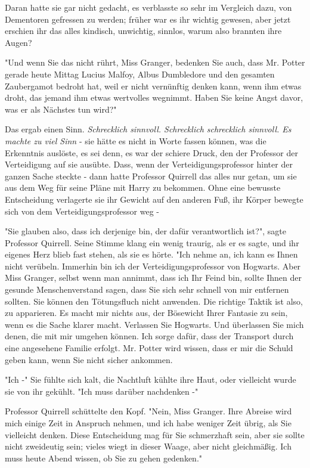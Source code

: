 {Daran hatte sie gar nicht gedacht, es verblasste so sehr im Vergleich dazu, von Dementoren gefressen zu werden; früher war es ihr wichtig gewesen, aber jetzt erschien ihr das alles kindisch, unwichtig, sinnlos, warum also brannten ihre Augen?

"Und wenn Sie das nicht rührt, Miss Granger, bedenken Sie auch, dass Mr. Potter gerade heute Mittag Lucius Malfoy, Albus Dumbledore und den gesamten Zaubergamot bedroht hat, weil er nicht vernünftig denken kann, wenn ihm etwas droht, das jemand ihm etwas wertvolles wegnimmt. Haben Sie keine Angst davor, was er als Nächstes tun wird?"

Das ergab einen Sinn. \emph{Schrecklich sinnvoll. Schrecklich schrecklich sinnvoll. Es machte zu viel Sinn} - sie hätte es nicht in Worte fassen können, was die Erkenntnis auslöste, es sei denn, es war der schiere Druck, den der Professor der Verteidigung auf sie ausübte. Dass, wenn der Verteidigungsprofessor hinter der ganzen Sache steckte - dann hatte Professor Quirrell das alles nur getan, um sie aus dem Weg für seine Pläne mit Harry zu bekommen. Ohne eine bewusste Entscheidung verlagerte sie ihr Gewicht auf den anderen Fuß, ihr Körper bewegte sich von dem Verteidigungsprofessor weg -

"Sie glauben also, dass ich derjenige bin, der dafür verantwortlich ist?", sagte Professor Quirrell. Seine Stimme klang ein wenig traurig, als er es sagte, und ihr eigenes Herz blieb fast stehen, als sie es hörte. "Ich nehme an, ich kann es Ihnen nicht verübeln. Immerhin bin ich der Verteidigungsprofessor von Hogwarts. Aber Miss Granger, selbst wenn man annimmt, dass ich Ihr Feind bin, sollte Ihnen der gesunde Menschenverstand sagen, dass Sie sich sehr schnell von mir entfernen sollten. Sie können den Tötungsfluch nicht anwenden. Die richtige Taktik ist also, zu apparieren. Es macht mir nichts aus, der Bösewicht Ihrer Fantasie zu sein, wenn es die Sache klarer macht. Verlassen Sie Hogwarts. Und überlassen Sie mich denen, die mit mir umgehen können. Ich sorge dafür, dass der Transport durch eine angesehene Familie erfolgt. Mr. Potter wird wissen, dass er mir die Schuld geben kann, wenn Sie nicht sicher ankommen.

"Ich -" Sie fühlte sich kalt, die Nachtluft kühlte ihre Haut, oder vielleicht wurde sie von ihr gekühlt. "Ich muss darüber nachdenken -"

Professor Quirrell schüttelte den Kopf. "Nein, Miss Granger. Ihre Abreise wird mich einige Zeit in Anspruch nehmen, und ich habe weniger Zeit übrig, als Sie vielleicht denken. Diese Entscheidung mag für Sie schmerzhaft sein, aber sie sollte nicht zweideutig sein; vieles wiegt in dieser Waage, aber nicht gleichmäßig. Ich muss heute Abend wissen, ob Sie zu gehen gedenken."

}
